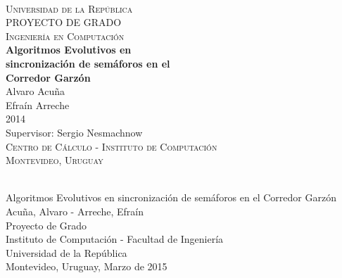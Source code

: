 \begin{titlepage}
  \thispagestyle{empty}
  \begin{center}
    ~\\[2.2cm]



    \textsc{\Huge Universidad de la República } \\[2.5cm]
    \textsc{\Huge PROYECTO DE GRADO } \\[0.5cm]
    \textsc{\Huge Ingeniería en Computación } \\[2.5cm]    
    \textbf{\Huge Algoritmos Evolutivos en } \\[0.2cm]
    \textbf{\Huge sincronización de semáforos en el } \\[0.3cm]
    \textbf{\Huge Corredor Garzón } \\[1.5cm]    
    
    {\huge Alvaro Acuña} \\[0.2cm]
    {\huge Efraín Arreche} \\[0.2cm]
    {\Large 2014} \\[2.0cm]
    {\Large Supervisor: Sergio Nesmachnow} \\[1.0cm]

    \textsc{\large Centro de Cálculo - Instituto de Computación} \\[0.2cm]
    \textsc{\large Montevideo, Uruguay} \\[1.5cm]

  \end{center}
  \vfill
\end{titlepage}
{
  \thispagestyle{empty}
  ~\\[16cm]
  Algoritmos Evolutivos en sincronización de semáforos en el Corredor Garzón \\[0.05cm]
  Acuña, Alvaro - Arreche, Efraín \\[0.05cm]
  Proyecto de Grado \\[0.05cm]
  Instituto de Computación - Facultad de Ingeniería \\[0.05cm]
  Universidad de la República \\[0.05cm]
  Montevideo, Uruguay, Marzo de 2015 \\[0.05cm]
  \vfill
  \cleardoublepage
}
\setcounter{page}{1}